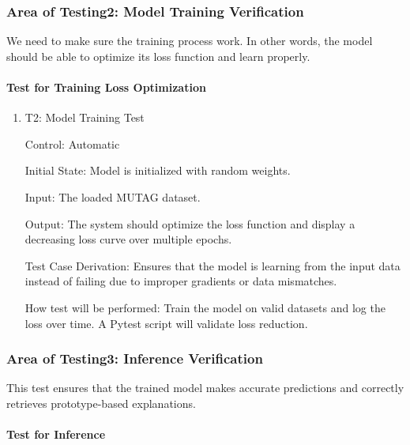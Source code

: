 \documentclass[12pt, titlepage]{article}
\begin{document}
\subsubsection{Area of Testing2: Model Training Verification}
We need to make sure the training process work. In other words, the model should be able to optimize its loss function and learn properly.

\paragraph{Test for Training Loss Optimization}

\begin{enumerate}
					
\item{T2: Model Training Test\\}

Control: Automatic
					
Initial State: Model is initialized with random weights.
					
Input: The loaded MUTAG dataset.
					
Output: The system should optimize the loss function and display a decreasing loss curve over multiple epochs.

Test Case Derivation: Ensures that the model is learning from the input data instead of failing due to improper gradients or data mismatches.

How test will be performed: Train the model on valid datasets and log the loss over time. A Pytest script will validate loss reduction.

\end{enumerate}

\subsubsection{Area of Testing3: Inference Verification}
This test ensures that the trained model makes accurate predictions and correctly retrieves prototype-based explanations.

\paragraph{Test for Inference}
\end{document}
